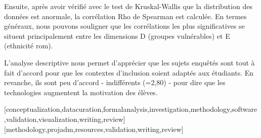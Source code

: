 \documentclass[french]{textolivre}
\begin{document}
Ensuite, après avoir vérifié avec le test de Kruskal-Wallis que la distribution des données est anormale, la corrélation Rho de Spearman est calculée. En termes généraux, nous pouvons souligner que les corrélations les plus significatives se situent principalement entre les dimensions D (groupes vulnérables) et E (ethnicité rom).

L'analyse descriptive nous permet d'apprécier que les sujets enquêtés sont tout à fait d'accord pour que les contextes d'inclusion soient adaptés aux étudiants. En revanche, ils sont peu d'accord - indifférents (=2,80) - pour dire que les technologies augmentent la motivation des élèves.


\printbibliography\label{sec-bib}


\begin{contributors}
[conceptualization,datacuration,formalanalysis,investigation,methodology,software,validation,visualization,writing,review]
[methodology,projadm,resources,validation,writing,review]
\end{contributors}
\end{document}
